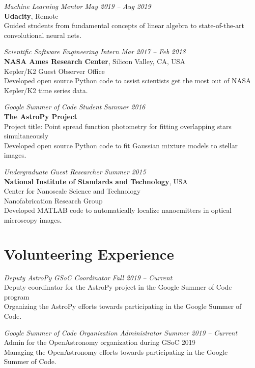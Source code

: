 \documentclass[10pt]{article}
\begin{document}
\begin{titlepage}
\emph{Machine Learning Mentor} \hfill \textit{May 2019  -- Aug 2019}
\\\textbf{Udacity}, Remote
\\ {\small Guided students from fundamental concepts of linear algebra to state-of-the-art convolutional neural nets.}
\vspace{.5cm}

\emph{Scientific Software Engineering Intern} \hfill \textit{Mar 2017 -- Feb 2018}
\\\textbf{NASA Ames Research Center}, Silicon Valley, CA, USA
\\Kepler/K2 Guest Observer Office
\\ {\small Developed open source \textsf{Python} code
    to assist scientists get the most out of NASA Kepler/K2 time series data.}
\vspace{.5cm}

\emph{Google Summer of Code Student} \hfill \textit{Summer 2016}
\\\textbf{The AstroPy Project}
\\ Project title: Point spread function photometry for fitting overlapping stars simultaneously
\\ {\small Developed open source \textsf{Python} code
    to fit Gaussian mixture models to stellar images.}
\vspace{.5cm}

\emph{Undergraduate Guest Researcher} \hfill \textit{Summer 2015}
\\\textbf{National Institute of Standards and Technology}, USA
\\Center for Nanoscale Science and Technology
\\Nanofabrication Research Group
\\ {\small Developed \textsf{MATLAB} code to automatically localize nanoemitters in optical microscopy images.}


\section*{Volunteering Experience}
\emph{Deputy AstroPy GSoC Coordinator} \hfill \textit{Fall 2019 -- Current}
\\Deputy coordinator for the AstroPy project in the Google Summer of Code program
\\ {\small Organizing the AstroPy efforts towards participating in the Google Summer of Code.}
\vspace{.5cm}

\emph{Google Summer of Code Organization Administrator} \hfill \textit{Summer 2019 -- Current}
\\Admin for the OpenAstronomy organization during GSoC 2019
\\ {\small Managing the OpenAstronomy efforts towards participating in the Google Summer of Code.}
\vspace{.5cm}


\end{titlepage}
\end{document}
